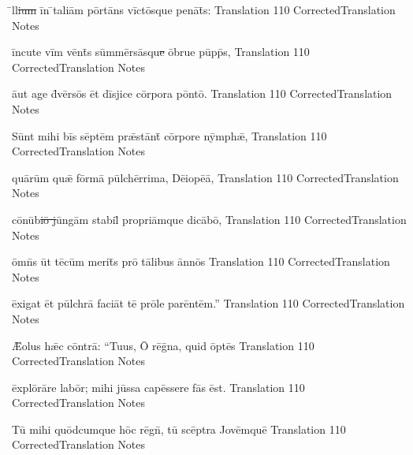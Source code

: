 \documentclass[]{book}
\begin{document}
\newpage

\latline
  {\={\macron {\i}}ll\sout{ium }\=in \={}t\-al\-i\=am p\=ort\={\macron a}ns v\=ict\={\macron o}squ\-e p\-en\={\macron a}t\={\macron {\i}}s:
}
  { Translation }
  {110}
  { CorrectedTranslation }
  { Notes }


\latline
  {\=inc\-ut\-e v\=im v\=ent\={\macron {\i}}s s\=umm\=ers\={\macron a}squ\sout{e }\=obrue p\=upp\={\macron {\i}}s,
}
  { Translation }
  {110}
  { CorrectedTranslation }
  { Notes }


\latline
  {\={au}t \-ag\-e d\={\macron {\i}}v\=ers\={\macron o}s \=et d\=isj\-ic\-e c\=orp\-or\-a p\=ont\={\macron o}.
}
  { Translation }
  {110}
  { CorrectedTranslation }
  { Notes }

\newpage

\latline
  {S\=unt m\-ih\-i b\=is s\=ept\=em pr\={\ae}st\=ant\={\macron {\i}} c\=orp\-or\-e n\=ymph\={\ae},
}
  { Translation }
  {110}
  { CorrectedTranslation }
  { Notes }


\latline
  {qu\={\macron a}r\=um qu\={\ae} f\=orm\={\macron a} p\=ulch\=err\-im\-a, D\={\macron e}\-i\-op\={\macron e}\=a,
}
  { Translation }
  {110}
  { CorrectedTranslation }
  { Notes }


\latline
  {c\={\macron o}n\={\macron u}b\sout{i\={\macron o} j}\=ung\=am st\-ab\-il\={\macron {\i}} pr\-opr\-i\=amqu\-e d\-ic\={\macron a}b\=o,
}
  { Translation }
  {110}
  { CorrectedTranslation }
  { Notes }

\newpage
\latline
  {\=omn\={\macron {\i}}s \=ut t\={\macron e}c\=um m\-er\-it\={\macron {\i}}s pr\={\macron o} t\={\macron a}l\-ib\-us \=ann\={\macron o}s
}
  { Translation }
  {110}
  { CorrectedTranslation }
  { Notes }


\latline
  {\=ex\-ig\-at \=et p\=ulchr\={\macron a} f\-ac\-i\=at t\={\macron e} pr\={\macron o}l\-e p\-ar\=ent\=em.''
}
  { Translation }
  {110}
  { CorrectedTranslation }
  { Notes }


\latline
  {\={\AE}\-ol\-us h\={\ae}c c\=ontr\={\macron a}:  ``T\-u\-us, \={\macron O} r\={\macron e}g\={\macron {\i}}n\-a, qu\-id \=opt\={\macron e}s}
  { Translation }
  {110}
  { CorrectedTranslation }
  { Notes }
\newpage

\latline
  {\=expl\={\macron o}r\={\macron a}r\-e l\-ab\=or; m\-ih\-i j\=uss\-a c\-ap\=ess\-er\-e f\={\macron a}s \=est.
}
  { Translation }
  {110}
  { CorrectedTranslation }
  { Notes }


\latline
  {T\={\macron u} m\-ih\-i qu\=odc\-umqu\-e h\=oc r\={\macron e}gn\={\macron {\i}}, t\={\macron u} sc\={\macron e}ptr\-a J\-ov\=emqu\=e
}
  { Translation }
  {110}
  { CorrectedTranslation }
  { Notes }
\end{document}
